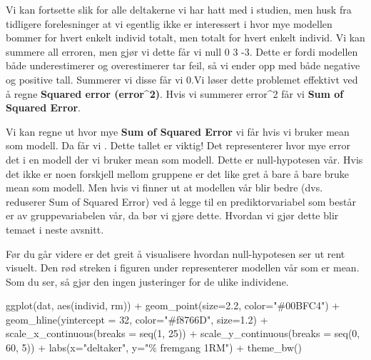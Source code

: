 \documentclass[
]{book}
\newenvironment{Shaded}{\begin{snugshade}}{\end{snugshade}}
\newcommand{\AttributeTok}[1]{\textcolor[rgb]{0.77,0.63,0.00}{#1}}
\newcommand{\DecValTok}[1]{\textcolor[rgb]{0.00,0.00,0.81}{#1}}
\newcommand{\FloatTok}[1]{\textcolor[rgb]{0.00,0.00,0.81}{#1}}
\newcommand{\FunctionTok}[1]{\textcolor[rgb]{0.00,0.00,0.00}{#1}}
\newcommand{\NormalTok}[1]{#1}
\newcommand{\SpecialCharTok}[1]{\textcolor[rgb]{0.00,0.00,0.00}{#1}}
\newcommand{\StringTok}[1]{\textcolor[rgb]{0.31,0.60,0.02}{#1}}
\begin{document}
Vi kan fortsette slik for alle deltakerne vi har hatt med i studien, men husk fra tidligere forelesninger at vi egentlig ikke er interessert i hvor mye modellen bommer for hvert enkelt individ totalt, men totalt for hvert enkelt individ. Vi kan summere all erroren, men gjør vi dette får vi null 0 3 -3. Dette er fordi modellen både underestimerer og overestimerer tar feil, så vi ender opp med både negative og positive tall. Summerer vi disse får vi 0.Vi løser dette problemet effektivt ved å regne \textbf{Squared error (error\^{}2)}. Hvis vi summerer error\^{}2 får vi \textbf{Sum of Squared Error}.

Vi kan regne ut hvor mye \textbf{Sum of Squared Error} vi får hvis vi bruker mean som modell. Da får vi . Dette tallet er viktig! Det representerer hvor mye error det i en modell der vi bruker mean som modell. Dette er null-hypotesen vår. Hvis det ikke er noen forskjell mellom gruppene er det like gret å bare å bare bruke mean som modell. Men hvis vi finner ut at modellen vår blir bedre (dvs. reduserer Sum of Squared Error) ved å legge til en prediktorvariabel som består er av gruppevariabelen vår, da bør vi gjøre dette. Hvordan vi gjør dette blir temaet i neste avsnitt.

Før du går videre er det greit å visualisere hvordan null-hypotesen ser ut rent visuelt. Den rød streken i figuren under representerer modellen vår som er mean. Som du ser, så gjør den ingen justeringer for de ulike individene.

\begin{Shaded}
\begin{Highlighting}[]
\FunctionTok{ggplot}\NormalTok{(dat, }\FunctionTok{aes}\NormalTok{(individ, rm)) }\SpecialCharTok{+} 
  \FunctionTok{geom\_point}\NormalTok{(}\AttributeTok{size=}\FloatTok{2.2}\NormalTok{, }\AttributeTok{color=}\StringTok{"\#00BFC4"}\NormalTok{) }\SpecialCharTok{+}
  \FunctionTok{geom\_hline}\NormalTok{(}\AttributeTok{yintercept =} \DecValTok{32}\NormalTok{, }\AttributeTok{color=}\StringTok{"\#f8766D"}\NormalTok{, }\AttributeTok{size=}\FloatTok{1.2}\NormalTok{) }\SpecialCharTok{+}
  \FunctionTok{scale\_x\_continuous}\NormalTok{(}\AttributeTok{breaks =} \FunctionTok{seq}\NormalTok{(}\DecValTok{1}\NormalTok{, }\DecValTok{25}\NormalTok{)) }\SpecialCharTok{+}
  \FunctionTok{scale\_y\_continuous}\NormalTok{(}\AttributeTok{breaks =} \FunctionTok{seq}\NormalTok{(}\DecValTok{0}\NormalTok{, }\DecValTok{60}\NormalTok{, }\DecValTok{5}\NormalTok{)) }\SpecialCharTok{+} 
  \FunctionTok{labs}\NormalTok{(}\AttributeTok{x=}\StringTok{"deltaker"}\NormalTok{, }\AttributeTok{y=}\StringTok{"\% fremgang 1RM"}\NormalTok{) }\SpecialCharTok{+}
  \FunctionTok{theme\_bw}\NormalTok{()}
\end{Highlighting}
\end{Shaded}
\end{document}
